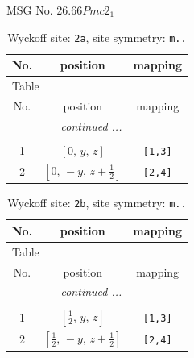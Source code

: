 \documentclass[fleqn,8pt]{jsarticle}
\begin{document}
\setcounter{MaxMatrixCols}{32}

\renewcommand{\tablename}{Table~}
\renewcommand{\figurename}{Figure~}
\begin{center}
\LARGE
MSG No. 26.66\quad$Pmc2_{1}$
\end{center}
\renewcommand{\arraystretch}{1.2}
\begin{longtable}{ccc}
\caption{Wyckoff site: {\tt 2a}, site symmetry: {\tt m..}}
 \\
 \hline \hline
No. & position & mapping \\ \hline \endfirsthead

\multicolumn{2}{l}{\tablename\ \thetable{}} \\
 \hline \hline
No. & position & mapping \\ \hline \endhead

 \hline \hline
\multicolumn{2}{r}{\footnotesize\it continued ...} \\ \endfoot

 \hline \hline
\multicolumn{2}{r}{} \\ \endlastfoot

1 & $\left[ 0,\, y,\, z \right]$ & {\tt [1,3]} \\ \hline
2 & $\left[ 0,\, - y,\, z + \frac{1}{2} \right]$ & {\tt [2,4]} \\
\end{longtable}
\renewcommand{\arraystretch}{1.2}
\begin{longtable}{ccc}
\caption{Wyckoff site: {\tt 2b}, site symmetry: {\tt m..}}
 \\
 \hline \hline
No. & position & mapping \\ \hline \endfirsthead

\multicolumn{2}{l}{\tablename\ \thetable{}} \\
 \hline \hline
No. & position & mapping \\ \hline \endhead

 \hline \hline
\multicolumn{2}{r}{\footnotesize\it continued ...} \\ \endfoot

 \hline \hline
\multicolumn{2}{r}{} \\ \endlastfoot

1 & $\left[ \frac{1}{2},\, y,\, z \right]$ & {\tt [1,3]} \\ \hline
2 & $\left[ \frac{1}{2},\, - y,\, z + \frac{1}{2} \right]$ & {\tt [2,4]} \\
\end{longtable}
\renewcommand{\arraystretch}{1.2}
\end{document}
